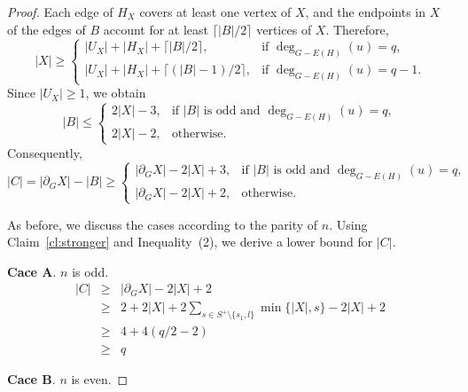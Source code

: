\documentclass[10pt,a4paper]{amsart}
\begin{document}
\begin{proof}
Each edge of \(H_X\) covers at least one vertex of \(X\), and the endpoints in \(X\) of the edges of \(B\) account for at least \(\lceil |B|/2\rceil\) vertices of \(X\). Therefore,
\[
|X|\ge
\begin{cases}
|U_X|+|H_X|+\lceil |B|/2\rceil, & \text{if } \deg_{G-E(H)}(u)=q,\\[8pt]
|U_X|+|H_X|+\lceil (|B|-1)/2\rceil, & \text{if } \deg_{G-E(H)}(u)=q-1.
\end{cases}
\]
Since \(|U_X|\ge 1\), we obtain
\[
|B|\le
\begin{cases}
2|X|-3, & \text{if } |B| \text{ is odd and } \deg_{G-E(H)}(u)=q,\\[8pt]
2|X|-2, & \text{otherwise}.
\end{cases}
\]
Consequently,
\[
|C|=|\partial_G X|-|B|\ge
\begin{cases}
|\partial_G X|-2|X|+3, & \text{if } |B| \text{ is odd and } \deg_{G-E(H)}(u)=q,\\[8pt]
|\partial_G X|-2|X|+2, & \text{otherwise}.
\end{cases}
\tag{2}
\]

As before, we discuss the cases according to the parity of \(n\). Using Claim~\ref{cl:stronger} and Inequality~(2), we derive a lower bound for \(|C|\).

{\bf Cace A}. $n$ is odd.
\begin{eqnarray*}
|C| &\geq& |\partial_G X|-2|X|+2 \\
&\geq &2+2|X|+2\sum\limits_{s\in S^+\setminus\{s_1,l\}}\min\{|X|,s\}-2|X|+2\\
&\geq &4+4(q/2-2)\\
&\geq &q
\end{eqnarray*}

{\bf Cace B}. $n$ is even.


\end{proof}
\end{document}
